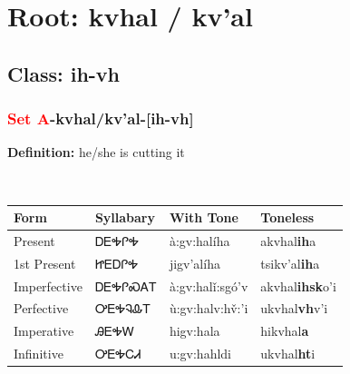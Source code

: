 \needspace{4in}
\section*{Root: kvhal / kv'al}
\nopagebreak
{}
\needspace{3in}
\subsection*{Class: ih-vh}
\nopagebreak
\needspace{2in}
\subsubsection*{\textcolor{Red}{Set A}{-}\textbf{kvhal/kv'al}{-}[ih-vh]}
\nopagebreak
\textbf{Definition: } he/she is cutting it
\\[0.5em]
\begin{tabularx}{\textwidth}{l X X X}%
\toprule%
\textbf{Form}&\textbf{Syllabary}&\textbf{With Tone}&\textbf{Toneless}\\%
\midrule%
Present&ᎠᎬᎭᎵᎭ&à:gv:halíha&akvhal\textbf{ih}a\\%
1st Present&ᏥᎬᎠᎵᎭ&jigv’alíha&tsikv'al\textbf{ih}a\\%
Imperfective&ᎠᎬᎭᎵᏍᎪᎢ&à:gv:halǐ:sgó’v&akvhal\textbf{ihsk}o'i\\%
Perfective&ᎤᎬᎭᎸᎲᎢ&ù:gv:halv:hv̌:’i&ukvhal\textbf{vh}v'i\\%
Imperative&ᎯᎬᎭᎳ&higv:hala&hikvhal\textbf{a}\\%
Infinitive&ᎤᎬᎭᏟᏗ&u:gv:hahldi&ukvhal\textbf{ht}i\\%
\bottomrule%
\end{tabularx}
\\[1em]